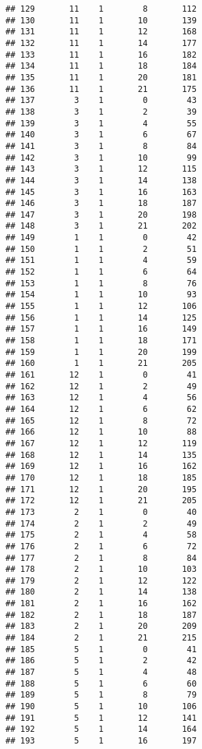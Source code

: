 \documentclass[
]{article}
\begin{document}
\begin{verbatim}
## 129       11    1        8       112
## 130       11    1       10       139
## 131       11    1       12       168
## 132       11    1       14       177
## 133       11    1       16       182
## 134       11    1       18       184
## 135       11    1       20       181
## 136       11    1       21       175
## 137        3    1        0        43
## 138        3    1        2        39
## 139        3    1        4        55
## 140        3    1        6        67
## 141        3    1        8        84
## 142        3    1       10        99
## 143        3    1       12       115
## 144        3    1       14       138
## 145        3    1       16       163
## 146        3    1       18       187
## 147        3    1       20       198
## 148        3    1       21       202
## 149        1    1        0        42
## 150        1    1        2        51
## 151        1    1        4        59
## 152        1    1        6        64
## 153        1    1        8        76
## 154        1    1       10        93
## 155        1    1       12       106
## 156        1    1       14       125
## 157        1    1       16       149
## 158        1    1       18       171
## 159        1    1       20       199
## 160        1    1       21       205
## 161       12    1        0        41
## 162       12    1        2        49
## 163       12    1        4        56
## 164       12    1        6        62
## 165       12    1        8        72
## 166       12    1       10        88
## 167       12    1       12       119
## 168       12    1       14       135
## 169       12    1       16       162
## 170       12    1       18       185
## 171       12    1       20       195
## 172       12    1       21       205
## 173        2    1        0        40
## 174        2    1        2        49
## 175        2    1        4        58
## 176        2    1        6        72
## 177        2    1        8        84
## 178        2    1       10       103
## 179        2    1       12       122
## 180        2    1       14       138
## 181        2    1       16       162
## 182        2    1       18       187
## 183        2    1       20       209
## 184        2    1       21       215
## 185        5    1        0        41
## 186        5    1        2        42
## 187        5    1        4        48
## 188        5    1        6        60
## 189        5    1        8        79
## 190        5    1       10       106
## 191        5    1       12       141
## 192        5    1       14       164
## 193        5    1       16       197

\end{verbatim}
\end{document}
